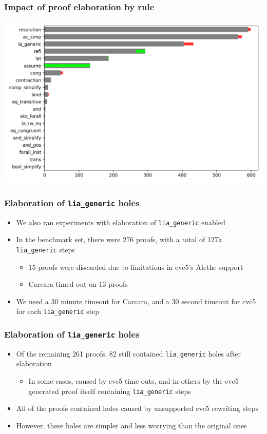 \documentclass[usepdftitle=false,aspectratio=169]{beamer}
\newcommand\vitem{\vfill\item}
\begin{document}
\begin{frame}
  \frametitle{Impact of proof elaboration by rule}
  \centering
  \includegraphics[height=0.85\textheight]{images/by-rules-comp.png}
\end{frame}

\begin{frame}
  \frametitle{Elaboration of \texttt{lia\_generic} holes}
  \begin{itemize}
    \item We also ran experiments with elaboration of \texttt{lia\_generic}
      enabled
    \vitem In the benchmark set, there were 276 proofs, with a total of 127k
    \texttt{lia\_generic} steps
    \begin{itemize}
      \item 15 proofs were discarded due to limitations in cvc5's Alethe support
      \item Carcara timed out on 13 proofs
    \end{itemize}
    \vitem We used a 30 minute timeout for Carcara, and a 30 second timeout for
    cvc5 for each \texttt{lia\_generic} step
  \end{itemize}
\end{frame}

\begin{frame}
  \frametitle{Elaboration of \texttt{lia\_generic} holes}
  \begin{itemize}
    \item Of the remaining 261 proofs, 82 still contained \texttt{lia\_generic}
      holes after elaboration
    \begin{itemize}
      \item In some cases, caused by cvc5 time outs, and in others by the cvc5
        generated proof itself containing \texttt{lia\_generic} steps
    \end{itemize}
    \vitem All of the proofs contained holes caused by unsupported cvc5 rewriting steps
    \pause
    \vitem However, these holes are simpler and less worrying than the original
    ones
  \end{itemize}
\end{frame}
\end{document}
